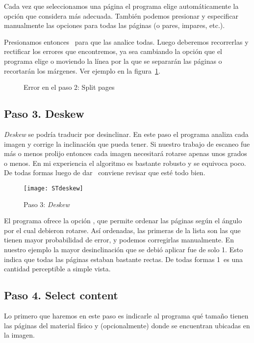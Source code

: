\documentclass[%
	a5paper,
	10pt,
	twoside,
	openright,
	final,
]{memoir}
\begin{document}
	Cada vez que seleccionamos una página el programa elige automáticamente la opción que considera más adecuada. También podemos presionar  y especificar manualmente las opciones para todas las páginas (o pares, impares, etc.).

	Presionamos entonces \play\ para que las analice todas. Luego deberemos recorrerlas y rectificar los errores que encontremos, ya sea cambiando la opción que el programa elige o moviendo la línea por la que se separarán las páginas o recortarán los márgenes. Ver ejemplo en la figura~\ref{fig:STsplitPagesError}.

	\begin{figure}
		\centering
		\hfill
		\caption{Error en el paso 2: Split pages\label{fig:STsplitPagesError}}
	\end{figure}

	\subsection{Paso 3. Deskew\label{sec:STdeskew}} \emph{Deskew} se podría traducir por desinclinar. En este paso el programa analiza cada imagen y corrige la inclinación que pueda tener. Si nuestro trabajo de escaneo fue más o menos prolijo entonces cada imagen necesitará rotarse apenas unos grados o menos. En mi experiencia el algoritmo es bastante robusto y se equivoca poco. De todas formas luego de dar \play\ conviene revisar que esté todo bien.

	\begin{figure}
		\centering
		\texttt{[image: STdeskew]}
		\caption{Paso 3: \emph{Deskew}\label{fig:STdeskew}}
	\end{figure}

	El programa ofrece la opción , que permite ordenar las páginas según el ángulo por el cual debieron rotarse. Así ordenadas, las primeras de la lista son las que tienen mayor probabilidad de error, y podemos corregirlas manualmente. En nuestro ejemplo la mayor desinclinación que se debió aplicar fue de solo 1\textdegree. Esto indica que todas las páginas estaban bastante rectas. De todas formas 1\textdegree\ es una cantidad perceptible a simple vista.

	\subsection{Paso 4. Select content\label{sec:STselectContent}} Lo primero que haremos en este paso es indicarle al programa qué tamaño tienen las páginas del material físico y (opcionalmente) donde se encuentran ubicadas en la imagen.
\end{document}
